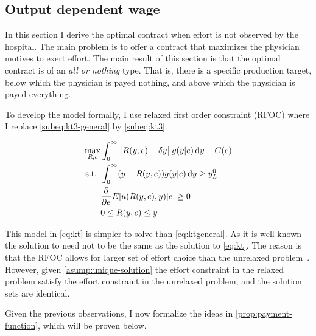 	\subsection{Output dependent wage} %
	\label{sub:output_dependent_wage}
	In this section I derive the optimal contract when effort is not observed by the hospital. The main problem is to offer a contract that maximizes the physician motives to exert effort. The main result of this section is that the optimal contract is of an \emph{all or nothing} type. That is, there is a specific production target, below which the physician is payed nothing, and above which the physician is payed everything. 
				
	To develop the model formally, I use \textcite{Rogerson1985FirstOrder} relaxed first order constraint (RFOC) where I replace \cref{subeq:kt3-general} by \cref{subeq:kt3}. 
				
	\begin{subequations}
		\label{eq:kt}
		\begin{align}
			\max_{R,e}   & \int_0^{\infty}\left[R(y,e)+\delta y\right]g(y|e)\dif y-C(e)\label{subeq:kt1} \\
			\text{s.t. } & \int_{0}^{\infty} (y-R(y,e))g(y|e)\dif y\geq y_L^0 \label{subeq:kt2}          \\
			             & \pder{e}E[u(R(y,e),y)|e]\geq 0 \label{subeq:kt3}                              \\
			             & 0\leq R(y,e)\leq y \label{subeq:kt4}                                          
		\end{align}
	\end{subequations}
				
	This model in \cref{eq:kt} is simpler to solve than \cref{eq:ktgeneral}. As it is well known the solution to need not to be the same as the solution to \cref{eq:kt}. The reason is that the RFOC allows for larger set of effort choice than the unrelaxed problem~\parencite[see][for a discussion]{Jewitt1988Justifying,Rogerson1985FirstOrder}. However, given \cref{asump:unique-solution} the effort constraint in the relaxed problem satisfy the effort constraint in the  unrelaxed problem, and the solution sets are identical. 
				
	Given the previous observations, I now formalize the ideas in \cref{prop:payment-function}, which will be proven below. 
				
